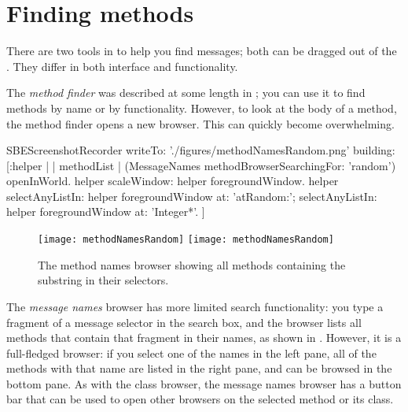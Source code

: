\documentclass[a4paper,10pt,twoside]{book}
\begin{document}


\section{Finding methods}
\label{sec:methodFinder} 

There are two tools in \sq to help you find messages; both can be dragged out of the \toolsflapind.
They differ in both interface and functionality.

The \emph{method finder} was described at some length in ; you can use it to find methods by name or by functionality. 
However, to look at the body of a method, the method finder opens a new browser.
This can quickly become overwhelming.

\begin{ExecuteSmalltalkScript}
SBEScreenshotRecorder writeTo: './figures/methodNamesRandom.png' building: [:helper |
	| methodList |
	(MessageNames methodBrowserSearchingFor: 'random') openInWorld.
	helper scaleWindow: helper foregroundWindow.
	helper
		selectAnyListIn: helper foregroundWindow at: 'atRandom:';
		selectAnyListIn: helper foregroundWindow at: 'Integer*'.
]
\end{ExecuteSmalltalkScript}
\begin{figure}[btp]
	\begin{center}
	\ifluluelse
		{\texttt{[image: methodNamesRandom]}}
		{\texttt{[image: methodNamesRandom]}}
	\end{center}
	\caption{The method names browser showing all methods containing the substring  in their selectors.}
	\label{fig:methodNamesRandom}
\end{figure}

The \emph{message names} browser has more limited search functionality: you type a fragment of a message selector in the search box, and the browser lists all methods that contain that fragment in their names, as shown in .
However, it is a full-fledged browser:
if you select one of the names in the left pane, all of the methods with that name are listed in the right pane, and can be browsed in the bottom pane.
As with the class browser, the message names browser has a button bar that can be used to open other  browsers on the selected method or its class.
\end{document}
